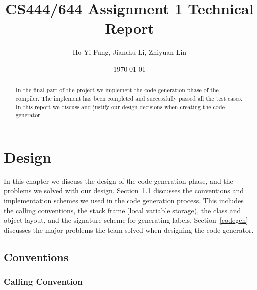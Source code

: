 \documentclass[a4paper, notitlepage]{report}
\title{CS444/644 Assignment 1 Technical Report}
\author{Ho-Yi Fung, Jianchu Li, Zhiyuan Lin}
\date{\today}
\begin{document}
{\let\newpage\relax\maketitle}

\vspace{30pt}

\begin{abstract}
In the final part of the project we implement the code generation phase of the compiler. The implement has been completed and successfully passed all the test cases. In this report we discuss and justify our design decisions when creating the code generator.
\end{abstract}


\chapter{Design}
\label{design}

In this chapter we discuss the design of the code generation phase, and the problems we solved with our design. Section~\ref{conventions} discusses the conventions and implementation schemes we used in the code generation process. This includes the calling conventions, the stack frame (local variable storage), the class and object layout, and the signature scheme for generating labels. Section~\ref{codegen} discusses the major problems the team solved when designing the code generator.

\section{Conventions}
\label{conventions}
\subsection{Calling Convention}
\label{calling}
\end{document}

